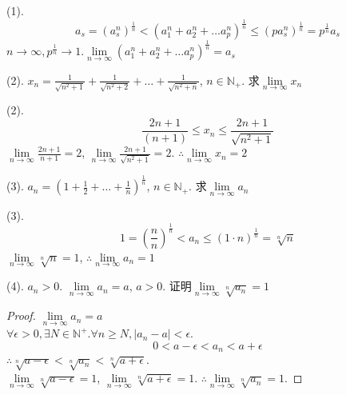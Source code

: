 \begin{solve}(1).
	\begin{equation*}\label{ex2.2.4Ex2}
		a_s = (a_s^n)^\frac{1}{n}
		<
		(a_1^n+a_2^n+\dots a_p^n)^\frac{1}{n}
		\leqslant
		(p a_s^n)^\frac{1}{n}=p^\frac{1}{n}a_s
	\end{equation*}
$ n\rightarrow\infty, p^\frac{1}{n}\rightarrow 1 $.$ \lim\limits_{n\rightarrow\infty}(a_1^n+a_2^n+\dots a_p^n)^\frac{1}{n} = a_s $
\end{solve}

(2). $ x_n= \frac{1}{\sqrt{n^2+1}}+\frac{1}{\sqrt{n^2+2}}+\dots+\frac{1}{\sqrt{n^2+n}} $, $ n\in \mathbb{N}_+ $. 求$ \lim\limits_{n\rightarrow\infty} x_n $
\begin{solve}(2).
\begin{equation*}
	\frac{2n+1}{(n+1)}\leqslant x_n\leqslant \frac{2n+1}{\sqrt{n^2+1}}
\end{equation*}
$ \lim\limits_{n\rightarrow\infty}\frac{2n+1}{n+1}=2 $, 
$ \lim\limits_{n\rightarrow\infty}\frac{2n+1}{\sqrt{n^2+1}}=2 $.
$ \therefore \lim\limits_{n\rightarrow\infty} x_n = 2 $
\end{solve}

(3). $ a_n = (1+\frac{1}{2}+\dots+\frac{1}{n})^{\frac{1}{n}} $, $ n\in\mathbb{N}_+ $. 求$ \lim\limits_{n\rightarrow\infty}a_n $
\begin{solve}(3).
	\begin{equation*}
		1=(\frac{n}{n})^\frac{1}{n} < a_n \leqslant (1\cdot n)^\frac{1}{n}=\sqrt[n]{n}
	\end{equation*}
$ \lim\limits_{n\rightarrow\infty} \sqrt[n]{n}=1 $, $ \therefore \lim\limits_{n\rightarrow\infty} a_n = 1$
\end{solve}

(4). $ a_n>0 $. $ \lim\limits_{n\rightarrow\infty}a_n = a $, $ a>0 $. 证明$ \lim\limits_{n\rightarrow\infty} \sqrt[n]{a_n}=1 $
\begin{proof}
$ \lim\limits_{n\rightarrow\infty}a_n = a $\\
$\forall \epsilon >0, \exists N \in \mathbb{N}^+. \forall n \geqslant N, |a_n-a| < \epsilon$.
\begin{equation*}
	0<a-\epsilon<a_n<a+\epsilon
\end{equation*}
$ \therefore \sqrt[n]{a-\epsilon}<\sqrt[n]{a_n}<\sqrt[n]{a+\epsilon} $.\\
$ \lim\limits_{n\rightarrow\infty}\sqrt[n]{a-\epsilon} = 1 $,
$ \lim\limits_{n\rightarrow\infty}\sqrt[n]{a+\epsilon} = 1 $. $ \therefore  \lim\limits_{n\rightarrow\infty}\sqrt[n]{a_n} = 1  $.
\end{proof}

